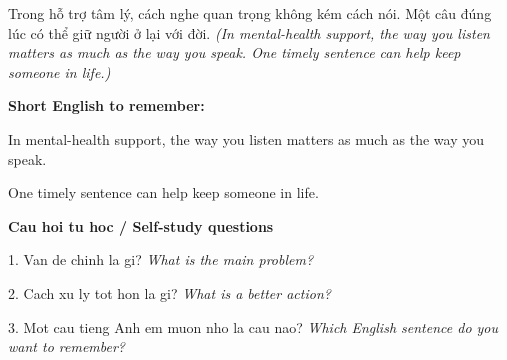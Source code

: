 \begin{baihoc}
Trong hỗ trợ tâm lý, cách nghe quan trọng không kém cách nói. Một câu đúng lúc có thể giữ người ở lại với đời.
\textit{(In mental-health support, the way you listen matters as much as the way you speak. One timely sentence can help keep someone in life.)}
\end{baihoc}

\begin{ghinhoanh}
\textbf{Short English to remember:}

In mental-health support, the way you listen matters as much as the way you speak.

One timely sentence can help keep someone in life.

\end{ghinhoanh}

\begin{tuhocnhanh}
\textbf{Cau hoi tu hoc / Self-study questions}

1. Van de chinh la gi? \textit{What is the main problem?}

2. Cach xu ly tot hon la gi? \textit{What is a better action?}

3. Mot cau tieng Anh em muon nho la cau nao? \textit{Which English sentence do you want to remember?}
\end{tuhocnhanh}
